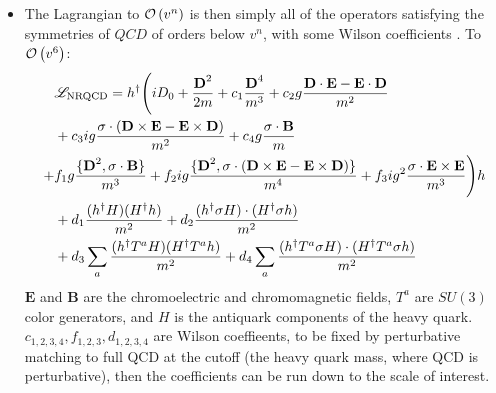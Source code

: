 \begin{itemize}
\item
The Lagrangian to $\mathcal{O}\left( v^n \right)$ is then simply all of the operators satisfying the symmetries of $QCD$ of orders below $v^n$, with some Wilson coefficients \cite{Lepage:1992tx}. To $\mathcal{O}\left( v^6 \right)$:
\begin{align}
\nonumber
	&\mathscr{L}_{\text{NRQCD}} = h^{\dagger} \Bigg( i D_0 + {{\textbf{D}}^2 \over 2m} + c_1 {{\textbf{D}}^4\over m^3}
	+ c_2 g{{\textbf{D}}\cdot {\textbf{E}} - {\textbf{E}} \cdot {\textbf{D}} \over m^2} \\
	\nonumber
	&+ c_3 ig{ {\bf{\sigma}}\cdot ({\textbf{D}}\times {\textbf{E}} - {\textbf{E}}\times {\textbf{D}})\over m^2}
	+ c_4 g{ {\bf{\sigma}}\cdot {\textbf{B}}\over m} \\
	+ \nonumber
	& f_1 g{\{{\textbf{D}}^2,{\bf{\sigma}}\cdot {\textbf{B}}\}\over m^3 }  
	+ f_2 ig{\{ {\textbf{D}}^2,{\bf{\sigma}}\cdot ( {\textbf{D}}\times {\textbf{E}} - {\textbf{E}}\times {\textbf{D}})\}\over m^4 }
	+ f_3 ig^2 {{\bf{\sigma}}\cdot {\textbf{E}}\times {\textbf{E}}\over m^3}  \Bigg)h \\
	\nonumber
	&+ d_1 { (h^{\dagger} H) (H^{\dagger} h) \over m^2} + d_2 { (h^{\dagger} {\bf{\sigma}} H) \cdot  (H^{\dagger}{\bf{\sigma}} h) \over m^2} \\
	&+ d_3 \sum_a {(h^{\dagger} T^a H) (H^{\dagger} T^a h) \over m^2} + d_4 \sum_a {(h^{\dagger} T^a {\bf{\sigma}} H) \cdot (H^{\dagger} T^a {\bf{\sigma}} h) \over m^2}
\end{align}
${\textbf{E}}$ and ${\textbf{B}}$ are the chromoelectric and chromomagnetic fields, $T^a$ are $SU(3)$ color generators, and $H$ is the antiquark components of the heavy quark. $c_{1,2,3,4},f_{1,2,3},d_{1,2,3,4}$ are Wilson coeffieents, to be fixed by perturbative matching to full QCD at the cutoff (the heavy quark mass, where QCD is perturbative), then the coefficients can be run down to the scale of interest.

\end{itemize}

